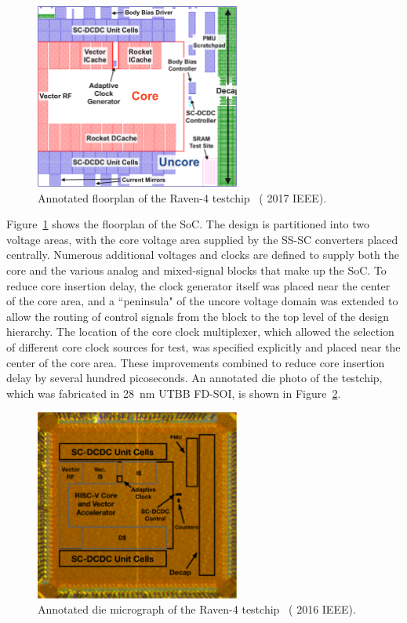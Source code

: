\documentclass[graybox]{svmult}
\begin{document}
\begin{figure}
  \centering
  \includegraphics[width=0.6\textwidth]{6-raven4-floorplan}
  \caption{Annotated floorplan of the Raven-4 testchip~\cite{Keller2017} ({\textcopyright} 2017 IEEE).}
  \label{fig:6-raven4-floorplan}
\end{figure}

Figure~\ref{fig:6-raven4-floorplan} shows the floorplan of the SoC.
The design is partitioned into two voltage areas, with the core voltage area supplied by the SS-SC converters placed centrally.
Numerous additional voltages and clocks are defined to supply both the core and the various analog and mixed-signal blocks that make up the SoC.
To reduce core insertion delay, the clock generator itself was placed near the center of the core area, and a ``peninsula" of the uncore voltage domain was extended to allow the routing of control signals from the block to the top level of the design hierarchy.
The location of the core clock multiplexer, which allowed the selection of different core clock sources for test, was specified explicitly and placed near the center of the core area.
These improvements combined to reduce core insertion delay by several hundred picoseconds.
An annotated die photo of the testchip, which was fabricated in \SI{28}{\nano\meter} UTBB FD-SOI, is shown in Figure~\ref{fig:6-raven4-diephoto}.

\begin{figure}
  \centering
  \includegraphics[width=0.6\textwidth]{6-raven4-diephoto}
  \caption{Annotated die micrograph of the Raven-4 testchip~\cite{Keller2016} ({\textcopyright} 2016 IEEE).}
  \label{fig:6-raven4-diephoto}
\end{figure}
\end{document}
